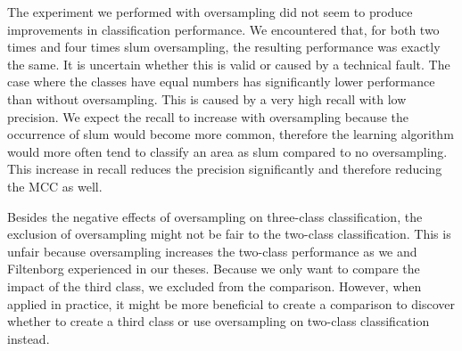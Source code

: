 The experiment we performed with oversampling did not seem to produce improvements in classification performance. We encountered that, for both two times and four times slum oversampling, the resulting performance was exactly the same. It is uncertain whether this is valid or caused by a technical fault. The case where the classes have equal numbers has significantly lower performance than without oversampling. This is caused by a very high recall with low precision. We expect the recall to increase with oversampling because the occurrence of slum would become more common, therefore the learning algorithm would more often tend to classify an area as slum compared to no oversampling. This increase in recall reduces the precision significantly and therefore reducing the MCC as well.

Besides the negative effects of oversampling on three-class classification, the exclusion of oversampling might not be fair to the two-class classification. This is unfair because oversampling increases the two-class performance as we and Filtenborg experienced in our theses. Because we only want to compare the impact of the third class, we excluded from the comparison. However, when applied in practice, it might be more beneficial to create a comparison to discover whether to create a third class or use oversampling on two-class classification instead.





